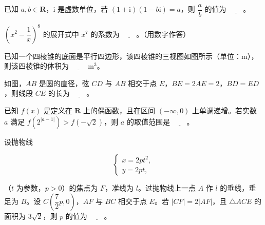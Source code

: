 \begin{question}
已知 \(a,b\in\mathbf{R}\)，\(\mathrm{i}\) 是虚数单位，若 \((1+\mathrm{i})(1-b\mathrm{i})=a\)，则 \(\dfrac{a}{b}\) 的值为 \(\underline{\qquad}\)。

\end{question}
\begin{question}
\(\left(x^{2}-\dfrac{1}{x}\right)^{8}\) 的展开式中 \(x^{7}\) 的系数为 \(\underline{\qquad}\)。（用数字作答）

\Needspace{0.4\textheight}
\end{question}
\begin{question}
已知一个四棱锥的底面是平行四边形，该四棱锥的三视图如图所示（单位：m），则该四棱锥的体积为 \(\underline{\qquad}\) \(\mathrm{m}^{3}\)。
\nopagebreak[4]
\begin{center}\end{center}
\nopagebreak[4]
\Needspace{0.4\textheight}
\end{question}
\begin{question}
如图，\(AB\) 是圆的直径，弦 \(CD\) 与 \(AB\) 相交于点 \(E\)，\(BE=2AE=2\)，\(BD=ED\)，则线段 \(CE\) 的长为 \(\underline{\qquad}\)。
\nopagebreak[4]
\begin{center}\end{center}
\nopagebreak[4]
\end{question}
\begin{question}
已知 \(f(x)\) 是定义在 \(\mathbf{R}\) 上的偶函数，且在区间 \((-\infty,0)\) 上单调递增。若实数 \(a\) 满足 \(f\left(2^{|a-1|}\right)>f\left(-\sqrt{2}\right)\)，则 \(a\) 的取值范围是 \(\underline{\qquad}\)。

\end{question}
\begin{question}
设抛物线

\nopagebreak[4]
\[
\begin{cases}
x=2pt^{2},\\
y=2pt,
\end{cases}
\]

（\(t\) 为参数，\(p>0\)）的焦点为 \(F\)，准线为 \(l\)。过抛物线上一点 \(A\) 作 \(l\) 的垂线，垂足为 \(B\)。设 \(C\left(\dfrac{7}{2}p,0\right)\)，\(AF\) 与 \(BC\) 相交于点 \(E\)。若 \(|CF|=2|AF|\)，且 \(\triangle ACE\) 的面积为 \(3\sqrt{2}\)，则 \(p\) 的值为 \(\underline{\qquad}\)。

\end{question}

